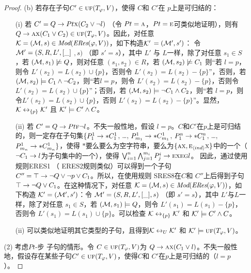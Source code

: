 \begin{proof}
	(b) 若存在子句$C'\in \textsc{uf}(T_\varphi,V)$，使得 $C$和 $C'$在 $p$上是可归结的：
	\begin{itemize}
		\item[(i)] 若 $C'= Q\rightarrow Pt \textsc{x} (C_2 \vee \neg l)$ （令 $Pt=\textsc{a}$，$Pt = \textsc{e}$可类似地证明），则有$Q\rightarrow \textsc{a} \textsc{x}(C_1 \vee C_2) \in \textsc{uf}(T_\varphi,V)$。因此，对任意 ${\cal K}=({\cal M}, s)\in \textit{Mod}(\emph{ERes}(\varphi,V))$，如下构造${\cal K}'$ $=({\cal M}',s')$： 令 ${\cal M}'= (S, R, L',[\_]$ $,s)$ （即 $s'=s$），其中 $L'$ 与 $L$一样，除了对任意 $s_1\in S$，若 $({\cal M}, s_1) \not \models Q$，则对任意 $(s_1, s_2) \in R$，若 $({\cal M}, s_2) \not \models C_1$ 则“若 $l=p$，则令 $L'(s_2) = L(s_2) \cup \{p\}$，否则令 $L'(s_2) = L(s_2) - \{p\}$”，否则，若$({\cal M}, s_2) \models  C_1 \wedge \neg C_2$，则“若$l=p$，则令 $L'(s_2) = L(s_2) - \{p\}$，否则令$L'(s_2) = L(s_2) \cup \{p\}$”；否则，若 $({\cal M}, s_2) \models \neg C_1 \wedge C_2$，则“若 $l=p$，则令$L'(s_2) = L(s_2) \cup \{p\}$，否则 $L'(s_2) = L(s_2) - \{p\}$”。显然， ${\cal K} \leftrightarrow_{\{p\}} {\cal K}'$ 且 ${\cal K}' \models C' \wedge C$。
		\item[(ii)] 若 $C' =  Q\rightarrow Pt \textsc{f} \neg l$。不失一般性地，假设 $l=p$。$C$和$C'$在$p$上是可归结的，则一定存在子句集$\{P_1^1 \rightarrow * C_1^1$, \dots, $P_{m_1}^1 \rightarrow * C_{m_1}^1$, $P_1^n \rightarrow * C_1^n$, \dots, $P_{m_n}^1 \rightarrow * C_{m_n}^1 \}$，使得  $*$要么要么为空字符串，要么为$\{\textsc{a} \textsc{x}, \textsc{e}_{{\langle{ind}\rangle}} \textsc{x}\}$中的一个（$\neg C_1 \rightarrow l$为子句集中的一个），使得 $\bigvee_{i=1}^n \bigwedge_{j=1}^{m_i} P_j^i \rightarrow \textsc{e} \textsc{x} \textsc{e} \textsc{g} l$。
		因此，通过使用规则ERES1 （ ERES2规则类似）可以得到一个子句 $C''=\top \rightarrow \neg Q \vee \neg p \vee C_1$。所以，在使用规则 SRES8在$C$和 $C''$上后得到子句$\top \rightarrow \neg Q \vee C_1$。在这种情况下，对任意 ${\cal K}=({\cal M}, s)\in \textit{Mod}(\emph{ERes}(\varphi,V))$，如下构造 ${\cal K}'=({\cal M}',s')$：令 ${\cal M}'= (S, R, L', [\_],s)$ （即 $s'=s$），其中 $L'$与$L$一样，除了对任意 $s_1\in S$，若 $({\cal M}, s_1) \models Q$，则令 $L'(s_1) = L(s_1) - \{p\}$，否则令 $L'(s_1) = L(s_1) \cup \{p\}$。可以检查 ${\cal K} \leftrightarrow_{\{p\}} {\cal K}'$ 和 ${\cal K}' \models C' \wedge C$。
		\item[(ii)] 可以类似地证明其它类型的子句，且得到${\cal K} \leftrightarrow_{U} {\cal K}'$ 和 ${\cal K}' \models \textsc{uf}(T_\varphi,V)$。
	\end{itemize}
	
	(2) 考虑$Pt$-步 子句的情形。令 $C\in \textsc{uf}(T_\varphi,V)$为 $Q \rightarrow \textsc{a} \textsc{x}(C_1 \vee  l)$。不失一般性地，假设存在某些子句$C'\in \textsc{uf}(T_\varphi,V)$，使得$C$和 $C'$在$p$上是可归结的（$l=p$）。
	

\end{proof}
